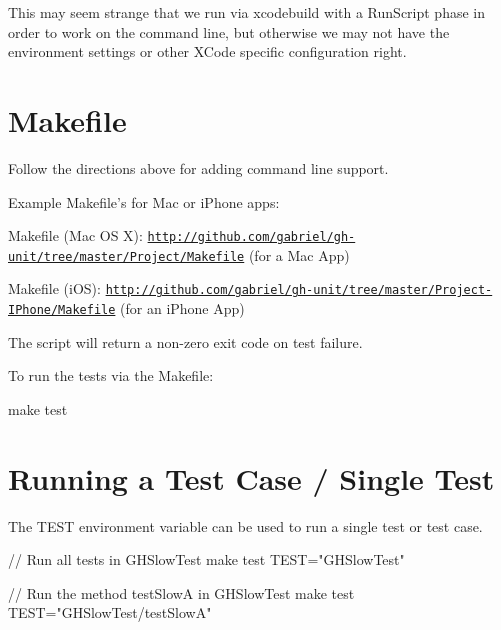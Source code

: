 \-This may seem strange that we run via xcodebuild with a \-Run\-Script phase in order to work on the command line, but otherwise we may not have the environment settings or other \-X\-Code specific configuration right.\hypertarget{_command_line_Makefile}{}\section{\-Makefile}\label{_command_line_Makefile}
\-Follow the directions above for adding command line support.

\-Example \-Makefile's for \-Mac or i\-Phone apps\-:


\begin{DoxyItemize}
\item \-Makefile (\-Mac \-O\-S \-X)\-: \href{http://github.com/gabriel/gh-unit/tree/master/Project/Makefile}{\tt http\-://github.\-com/gabriel/gh-\/unit/tree/master/\-Project/\-Makefile} (for a \-Mac \-App)
\item \-Makefile (i\-O\-S)\-: \href{http://github.com/gabriel/gh-unit/tree/master/Project-IPhone/Makefile}{\tt http\-://github.\-com/gabriel/gh-\/unit/tree/master/\-Project-\/\-I\-Phone/\-Makefile} (for an i\-Phone \-App)
\end{DoxyItemize}

\-The script will return a non-\/zero exit code on test failure.

\-To run the tests via the \-Makefile\-:

\begin{DoxyVerb}
 make test
 \end{DoxyVerb}
\hypertarget{_command_line_RunningATest}{}\section{\-Running a Test Case / Single Test}\label{_command_line_RunningATest}
\-The {\ttfamily \-T\-E\-S\-T} environment variable can be used to run a single test or test case.

\begin{DoxyVerb}
 // Run all tests in GHSlowTest
 make test TEST="GHSlowTest"
 
 // Run the method testSlowA in GHSlowTest	
 make test TEST="GHSlowTest/testSlowA"
 \end{DoxyVerb}
 